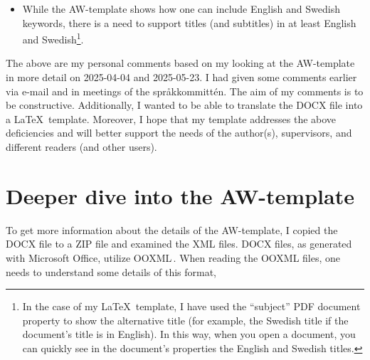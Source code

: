 \documentclass[12pt, twoside]{article}
\begin{document}
\clearpage
\begin{itemize}[resume*, label=\color{red}]
\item While the AW-template shows how one can include English and Swedish keywords, there is a need to support titles (and subtitles) in at least English and Swedish\footnote{In the case of my \LaTeX\ template, I have used the ``subject'' PDF document property to show the alternative title (for example, the Swedish title if the document's title is in English). In this way, when you open a document, you can quickly see in the document's properties the English and Swedish titles.}.
\end{itemize}

The above are my personal comments based on my looking at the AW-template in more detail on 2025-04-04 and 2025-05-23. I had given some comments earlier via e-mail and in meetings of the \foreignlanguage{swedish}{språkkommittén}. The aim of my comments is to be constructive. Additionally, I wanted to be able to translate the \gls{DOCX} file into a \LaTeX\ template. Moreover, I hope that my template addresses the above deficiencies and will better support the needs of the author(s), supervisors, and different readers (and other users).


\section{Deeper dive into the AW-template}
\label{sec:cycle3DeepDive}
To get more information about the details of the AW-template, I copied the \gls{DOCX} file to a ZIP file and examined the \gls{XML} files.
\gls{DOCX} files, as generated with Microsoft Office, utilize \gls{OOXML}\,\cite{ISOIEC_29500_1:2016}. When reading the \gls{OOXML} files, one needs to understand some details of this format,
\end{document}

